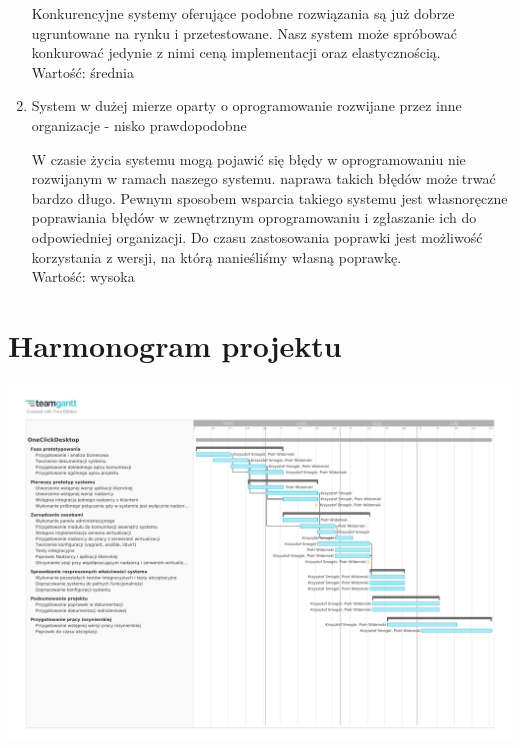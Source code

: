 \documentclass[12pt]{article}
\begin{document}
\begin{enumerate}
	      Konkurencyjne systemy oferujące podobne rozwiązania są już dobrze ugruntowane na rynku i przetestowane. Nasz system może spróbować konkurować jedynie z nimi ceną implementacji oraz elastycznością.\\
	      Wartość: średnia
	\item System w dużej mierze oparty o oprogramowanie rozwijane przez inne organizacje - nisko prawdopodobne

	      W czasie życia systemu mogą pojawić się błędy w oprogramowaniu nie rozwijanym w ramach naszego systemu. naprawa takich błędów może trwać bardzo długo. Pewnym sposobem wsparcia takiego systemu jest własnoręczne poprawiania błędów w zewnętrznym oprogramowaniu i zgłaszanie ich do odpowiedniej organizacji. Do czasu zastosowania poprawki jest możliwość korzystania z wersji, na którą nanieśliśmy własną poprawkę.\\
	      Wartość: wysoka

\end{enumerate}


\section{Harmonogram projektu}
\includegraphics[width=\textwidth]{resources/gantt.pdf}
\end{document}
